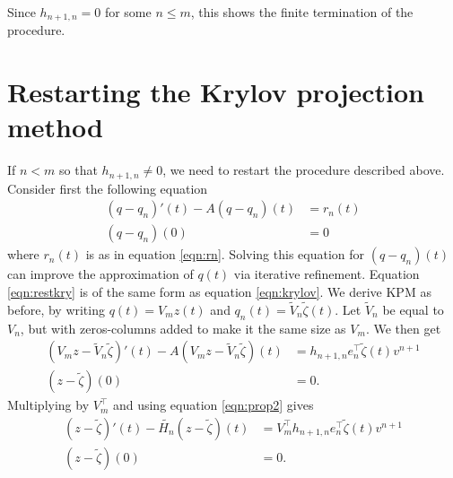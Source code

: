Since $h_{n+1,n} = 0$ for some $n \leq m$, this shows the finite termination of the procedure. %


\section{Restarting the Krylov projection method} \label{sec:rest}
If $n < m$ so that $h_{n+1,n} \neq 0$, we need to restart the procedure described above. Consider first the following equation
\begin{equation}\label{eqn:restkry}
\begin{aligned}
 (q-q_n)'(t) -A (q-q_n)(t) &= r_n(t) \\
(q-q_n)(0)& = 0
\end{aligned}
\end{equation}
where $r_n(t)$ is as in equation \eqref{eqn:rn}. Solving this equation for $(q-q_n)(t)$ can improve the approximation of $q(t)$ via iterative refinement.
Equation \eqref{eqn:restkry} is of the same form as equation \eqref{eqn:krylov}. We derive KPM as before, by writing $q(t) = V_m z(t)$ and $q_n(t) = \tilde{V}_n \tilde{\zeta}(t) $.
Let $\tilde{V}_n$ be equal to $V_n$, but with zeros-columns added to make it the same size as $V_m$. 
We then get
\begin{equation*}
\begin{aligned}
 (V_m z-\tilde{V}_n \tilde{\zeta})'(t)-A (V_m z-\tilde{V}_n \tilde{\zeta})(t) &=  h_{n+1,n}e_n^\top \tilde{\zeta}(t) v^{n+1}  \\
(z-\tilde{\zeta})(0)& = 0 .
\end{aligned}
\end{equation*}
Multiplying by $V_m^{\top}$ and using equation \eqref{eqn:prop2} gives
\begin{equation*}
\begin{aligned}
 (z-\tilde{\zeta})'(t)-\tilde{H_n} (z-\tilde{\zeta})(t) &= V_m^\top h_{n+1,n}e_n^\top \tilde{\zeta}(t) v^{n+1}  \\
(z-\tilde{\zeta})(0)& = 0.
\end{aligned}
\end{equation*}
